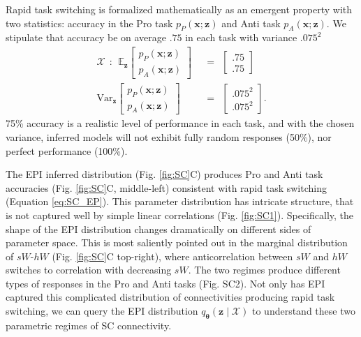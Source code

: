 \documentclass[11pt]{article}
\begin{document}
Rapid task switching is formalized mathematically as an emergent property with two statistics: accuracy in the Pro task $p_P(\mathbf{x}; \mathbf{z})$ and Anti task $p_A(\mathbf{x}; \mathbf{z})$.
We stipulate that accuracy be on average $.75$ in each task with variance $.075^2$
\begin{equation}\label{eq:SC_EP}
\begin{split}
\mathcal{X} ~~:~~ \mathbb{E}_{\mathbf{z}}\begin{bmatrix} p_P(\mathbf{x}; \mathbf{z}) \\ p_A(\mathbf{x}; \mathbf{z}) \end{bmatrix}  &~~=~~  \begin{bmatrix} .75 \\ .75 \end{bmatrix}  \\ 
 \text{Var}_{\mathbf{z}}\begin{bmatrix} p_P(\mathbf{x}; \mathbf{z}) \\ p_A(\mathbf{x}; \mathbf{z}) \end{bmatrix}  &~~=~~  \begin{bmatrix} .075^2 \\ .075^2  \end{bmatrix}.
\end{split}
\end{equation}
75\% accuracy is a realistic level of performance in each task, and with the chosen variance, inferred models will not exhibit fully random responses (50\%), nor perfect performance (100\%).

The EPI inferred distribution  (Fig. \ref{fig:SC}C) produces Pro and Anti task accuracies (Fig. \ref{fig:SC}C, middle-left) consistent with rapid task switching (Equation \ref{eq:SC_EP}).
This parameter distribution has intricate structure, that is not captured well by simple linear correlations (Fig. \ref{fig:SC1}).
Specifically, the shape of the EPI distribution changes dramatically on different sides of parameter space.
This is most saliently pointed out in the marginal distribution of  $sW$-$hW$ (Fig. \ref{fig:SC}C top-right), where anticorrelation between $sW$ and $hW$ switches to correlation with decreasing $sW$.
The two regimes produce different types of responses in the Pro and Anti tasks (Fig. SC2).
Not only has EPI captured this complicated distribution of connectivities producing rapid task switching, we can query the EPI distribution $q_{\bm{\theta}}(\mathbf{z} \mid \mathcal{X})$ to understand these two parametric regimes of SC connectivity.
\end{document}
